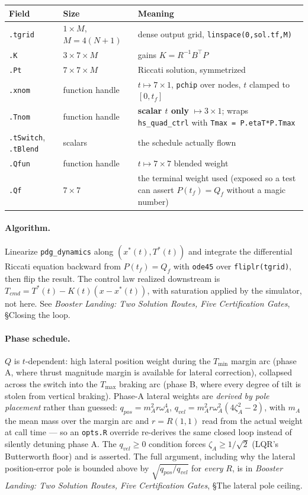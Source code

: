 \documentclass[11pt]{article}
\newcommand{\thenote}{\emph{Booster Landing: Two Solution Routes, Five
Certification Gates}}
\newcommand{\noteS}[1]{\thenote, \S#1}
\newcommand{\Tmin}{T_{\min}}
\newcommand{\Tmax}{T_{\max}}
\begin{document}
\begin{center}
\begin{tabular}{@{}llL{7.4cm}@{}}
\toprule
Field & Size & Meaning \\
\midrule
\texttt{.tgrid} & $1\times M$, $M = 4(N{+}1)$ & dense output grid,
  \texttt{linspace(0,sol.tf,M)} \\
\texttt{.K}  & $3\times7\times M$ & gains $K = R^{-1}B^\top P$ \\
\texttt{.Pt} & $7\times7\times M$ & Riccati solution, symmetrized \\
\texttt{.xnom} & function handle & $t\mapsto7\times1$, \texttt{pchip} over
  nodes, $t$ clamped to $[0,t_f]$ \\
\texttt{.Tnom} & function handle & \textbf{scalar $t$ only}
  $\mapsto3\times1$; wraps \texttt{hs\_quad\_ctrl} with
  \texttt{Tmax = P.etaT*P.Tmax} \\
\texttt{.tSwitch}, \texttt{.tBlend} & scalars & the schedule actually flown \\
\texttt{.Qfun} & function handle & $t\mapsto7\times7$ blended weight \\
\texttt{.Qf} & $7\times7$ & the terminal weight used (exposed so a test can
  assert $P(t_f)=Q_f$ without a magic number) \\
\bottomrule
\end{tabular}
\end{center}

\paragraph{Algorithm.} Linearize \texttt{pdg\_dynamics} along
$(x^*(t), T^*(t))$ and integrate the differential Riccati equation backward
from $P(t_f) = Q_f$ with \texttt{ode45} over \texttt{fliplr(tgrid)}, then
flip the result. The control law realized downstream is
$T_{cmd} = T^*(t) - K(t)(x - x^*(t))$, with saturation applied by the
simulator, not here. See \noteS{Closing the loop}.

\paragraph{Phase schedule.} $Q$ is $t$-dependent: high lateral position
weight during the $\Tmin$ margin arc (phase A, where thrust magnitude margin
is available for lateral correction), collapsed across the switch into the
$\Tmax$ braking arc (phase B, where every degree of tilt is stolen from
vertical braking). Phase-A lateral weights are \emph{derived by pole
placement} rather than guessed:
$q_{pos} = m_A^2 r \omega_A^4$, $q_{vel} = m_A^2 r \omega_A^2(4\zeta_A^2-2)$,
with $m_A$ the mean mass over the margin arc and $r = R(1,1)$ read from the
actual weight at call time --- so an \texttt{opts.R} override re-derives the
same closed loop instead of silently detuning phase A. The
$q_{vel}\ge0$ condition forces $\zeta_A \ge 1/\sqrt2$ (LQR's Butterworth
floor) and is asserted. The full argument, including why the lateral
position-error pole is bounded above by $\sqrt{q_{pos}/q_{vel}}$ for
\emph{every} $R$, is in \noteS{The lateral pole ceiling}.
\end{document}
